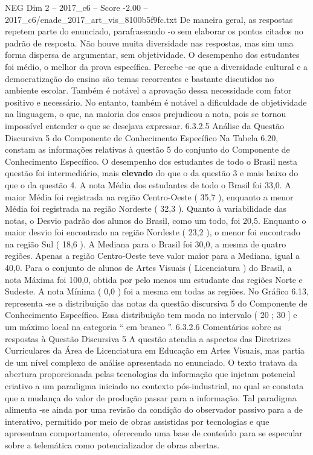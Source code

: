 \begin{textsample}{NEG Dim 2 – 2017\_c6 – Score -2.00 – 2017\_c6/enade\_2017\_art\_vis\_8100b5f9fc.txt}
De maneira geral, as respostas repetem parte do enunciado, parafraseando -o sem elaborar os pontos citados no padrão de resposta.
Não houve muita diversidade nas respostas, mas sim uma forma dispersa de argumentar, sem objetividade.
O desempenho dos estudantes foi médio, o melhor da prova específica.
Percebe -se que a diversidade cultural e a democratização do ensino são temas recorrentes e bastante discutidos no ambiente escolar.
Também é notável a aprovação dessa necessidade com fator positivo e necessário.
No entanto, também é notável a dificuldade de objetividade na linguagem, o que, na maioria dos casos prejudicou a nota, pois se tornou impossível entender o que se desejava expressar. 6.3.2.5 Análise da Questão Discursiva 5 do Componente de Conhecimento Específico Na Tabela 6.20, constam as informações relativas à questão 5 do conjunto do Componente de Conhecimento Específico.
O desempenho dos estudantes de todo o Brasil nesta questão foi intermediário, mais \textbf{elevado} do que o da questão 3 e mais baixo do que o da questão 4.
A nota Média dos estudantes de todo o Brasil foi 33,0.
A maior Média foi registrada na região Centro-Oeste ( 35,7 ), enquanto a menor Média foi registrada na região Nordeste ( 32,3 ).
Quanto à variabilidade das notas, o Desvio padrão dos alunos do Brasil, como um todo, foi 20,5.
Enquanto o maior desvio foi encontrado na região Nordeste ( 23,2 ), o menor foi encontrado na região Sul ( 18,6 ).
A Mediana para o Brasil foi 30,0, a mesma de quatro regiões.
Apenas a região Centro-Oeste teve valor maior para a Mediana, igual a 40,0.
Para o conjunto de alunos de Artes Visuais ( Licenciatura ) do Brasil, a nota Máxima foi 100,0, obtida por pelo menos um estudante das regiões Norte e Sudeste.
A nota Mínima ( 0,0 ) foi a mesma em todas as regiões.
No Gráfico 6.13, representa -se a distribuição das notas da questão discursiva 5 do Componente de Conhecimento Específico.
Essa distribuição tem moda no intervalo ( 20 ; 30 ] e um máximo local na categoria “ em branco ”. 6.3.2.6 Comentários sobre as respostas à Questão Discursiva 5 A questão atendia a aspectos das Diretrizes Curriculares da Área de Licenciatura em Educação em Artes Visuais, mas partia de um nível complexo de análise apresentada no enunciado.
O texto tratava da abertura proporcionada pelas tecnologias da informação que injetam potencial criativo a um paradigma iniciado no contexto pós-industrial, no qual se constata que a mudança do valor de produção passar para a informação.
Tal paradigma alimenta -se ainda por uma revisão da condição do observador passivo para a de interativo, permitido por meio de obras assistidas por tecnologias e que apresentam comportamento, oferecendo uma base de conteúdo para se especular sobre a telemática como potencializador de obras abertas.

\end{textsample}
